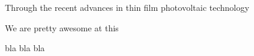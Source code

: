 Through the recent advances in thin film photovoltaic technology 

We are pretty awesome at this

bla bla bla
